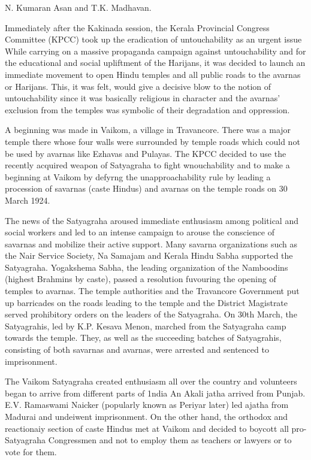 N. Kumaran Asan and T.K. Madhavan.

Immediately after the Kakinada session, the Kerala Provincial Congress Committee (KPCC) took up the eradication of untouchability as an urgent issue While carrying on a massive propaganda campaign against untouchability and for the educational and social upliftment of the Harijans, it was decided to launch an immediate movement to open Hindu temples and all public roads to the avarnas or Harijans. This, it was felt, would give a decisive blow to the notion of untouchability since it was basically religious in character and the avarnas' exclusion from the temples was symbolic of their degradation and oppression.

A beginning was made in Vaikom, a village in Travancore. There was a major temple there whose four walls were surrounded by temple roads which could not be used by avarnas like Ezhavas and Pulayas. The KPCC decided to use the recently acquired weapon of Satyagraha to fight wnouchability and to make a beginning at Vaikom by defyrng the unapproachability rule by leading a procession of savarnas (caste Hindus) and avarnas on the temple roads on 30 March 1924.

The news of the Satyagraha aroused immediate enthusiasm among political and social workers and led to an intense campaign to arouse the conscience of savarnas and mobilize their active support. Many savarna organizations such as the Nair Service Society, Na Samajam and Kerala Hindu Sabha supported the Satyagraha. Yogakshema Sabha, the leading organization of the Namboodins (highest Brahmins by caste), passed a resolution fuvouring the opening of temples to avarnas. The temple authorities and the Travancore Government put up barricades on the roads leading to the temple and the District Magistrate served prohibitory orders on the leaders of the Satyagraha. On 30th March, the Satyagrahis, led by K.P. Kesava Menon, marched from the Satyagraha camp towards the temple. They, as well as the succeeding batches of Satyagrahis, consisting of both savarnas and avarnas, were arrested and sentenced to imprisonment.

The Vaikom Satyagraha created enthusiasm all over the country and volunteers began to arrive from different parts of 1ndia An Akali jatha arrived from Punjab. E.V. Ramaswami Naicker (popularly known as Periyar later) led ajatha from Madurai and undeiwent imprisonment. On the other hand, the orthodox and reactionaiy section of caste Hindus met at Vaikom and decided to boycott all pro-Satyagraha Congressmen and not to employ them as teachers or lawyers or to vote for them.

